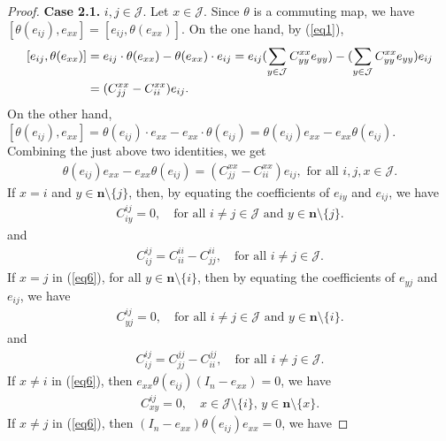 \documentclass[reqno]{amsart}
\theoremstyle{plain}
\theoremstyle{definition}
\begin{document}
\begin{proof}
\textbf{Case 2.1.} $ i,j \in \mathcal{J} $. Let $ x \in \mathcal{J} $. Since $ \theta $ is a commuting map, we have $ [\theta(e_{ij}), e_{xx}] = [e_{ij}, \theta(e_{xx})] $.
On the one hand, by (\ref{eq1}), 
\[
\begin{aligned} 
\relax[e_{ij},\theta(e_{xx})]&= e_{ij}\cdot \theta(e_{xx})-\theta(e_{xx})\cdot  e_{ij} = e_{ij} ( \sum_{y \in \mathcal{J}} C_{yy}^{xx} e_{yy})-(\sum_{y \in \mathcal{J}} C_{yy}^{xx} e_{yy}) e_{ij} \\
&= ( C_{jj}^{xx} - C_{ii}^{xx} ) e_{ij}.
\end{aligned}
\]
On the other hand, 
$
[\theta(e_{ij}), e_{xx}] = \theta(e_{ij}) \cdot  e_{xx} - e_{xx} \cdot  \theta(e_{ij}) = \theta(e_{ij}) e_{xx} - e_{xx} \theta(e_{ij}).
$
Combining the just above two identities, we get  
 \begin{align}\label{eq6}
 \theta(e_{ij}) e_{xx} - e_{xx} \theta(e_{ij}) = \left( C_{jj}^{xx} - C_{ii}^{xx} \right) e_{ij},   \text{ for all }  i, j,x \in \mathcal{J}.
 \end{align}
If $ x = i $ and $ y \in \mathbf{n} \setminus \{j\} $, then, by equating the coefficients of $ e_{iy} $ and $ e_{ij} $, we have 
 \begin{align}\label{eq7}
 C_{iy}^{ij} = 0, \quad \text{for all } i \neq j \in \mathcal{J} \text{ and } y \in \mathbf{n} \setminus \{j\}.
 \end{align}
and 
 \begin{align}\label{eq8}
C_{ij}^{ij} = C_{ii}^{ii} - C_{jj}^{ii}, \quad \text{for all } i \neq j \in \mathcal{J}. 
\end{align}
If $ x = j $ in (\ref{eq6}), for all $ y \in \mathbf{n} \setminus \{i\} $, then  by equating the coefficients of $ e_{yj} $ and $ e_{ij} $, we have 
 \begin{align}\label{eq9}
C_{yj}^{ij} = 0, \quad \text{for all } i \neq j \in \mathcal{J} \text{ and } y \in \mathbf{n} \setminus \{i\}. 
\end{align}
and 
 \begin{align}\label{eq10}
C_{ij}^{ij} = C_{jj}^{jj} - C_{ii}^{jj}, \quad \text{for all }  i \neq j \in \mathcal{J}. 
 \end{align}
If $ x \neq i $ in (\ref{eq6}), then $ e_{xx} \theta(e_{ij}) (I_n - e_{xx}) = 0 $, we have
 \begin{align}\label{eq11}
C_{xy}^{ij} = 0, \quad x \in \mathcal{J} \setminus \{i\}, \, y \in \mathbf{n} \setminus \{x\}.
\end{align}
If $ x \neq j $ in (\ref{eq6}), then $ (I_n - e_{xx}) \theta(e_{ij}) e_{xx} = 0 $, we have

\end{proof}
\end{document}
